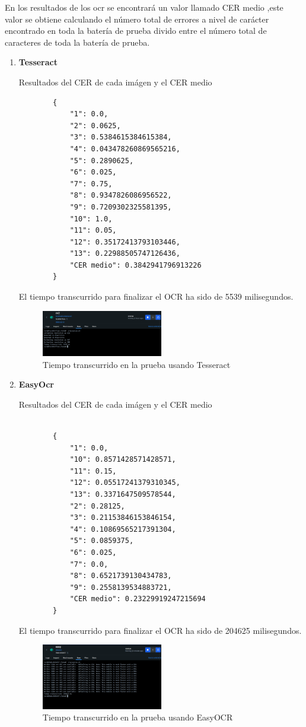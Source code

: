 En los resultados de los ocr se encontrará un valor llamado CER medio ,este valor se obtiene calculando el número total de errores a nivel de carácter encontrado en toda la batería de prueba divido entre el número total de caracteres de toda la batería de prueba.
\begin{enumerate}
	\item \textbf{Tesseract}
	
	
	Resultados del CER de cada imágen y el CER medio
	\begin{verbatim}
		{
			"1": 0.0,
			"2": 0.0625,
			"3": 0.5384615384615384,
			"4": 0.043478260869565216,
			"5": 0.2890625,
			"6": 0.025,
			"7": 0.75,
			"8": 0.9347826086956522,
			"9": 0.7209302325581395,
			"10": 1.0,
			"11": 0.05,
			"12": 0.35172413793103446,
			"13": 0.22988505747126436,
			"CER medio": 0.3842941796913226
		}
	\end{verbatim}
	El tiempo transcurrido para finalizar el OCR ha sido de 5539 milisegundos.
	\begin{figure}[H]
		\centering
		\includegraphics[width = 0.5\textwidth]{Imagenes/OCR/Tiempo_Tesseract.png}
		\caption{Tiempo transcurrido en la prueba usando Tesseract}
	\end{figure}
	\item \textbf{EasyOcr}
	
	Resultados del CER de cada imágen y el CER medio
	\begin{verbatim}
	
		{
			"1": 0.0,
			"10": 0.8571428571428571,
			"11": 0.15,
			"12": 0.05517241379310345,
			"13": 0.3371647509578544,
			"2": 0.28125,
			"3": 0.21153846153846154,
			"4": 0.10869565217391304,
			"5": 0.0859375,
			"6": 0.025,
			"7": 0.0,
			"8": 0.6521739130434783,
			"9": 0.2558139534883721,
			"CER medio": 0.23229919247215694
		}
	\end{verbatim}
	
		El tiempo transcurrido para finalizar el OCR ha sido de 204625 milisegundos.
	\begin{figure}[H]
		\centering
		\includegraphics[width = 0.5\textwidth]{Imagenes/OCR/Tiempo_EasyOcr.png}
		\caption{Tiempo transcurrido en la prueba usando EasyOCR}
	\end{figure}
	

\end{enumerate}

